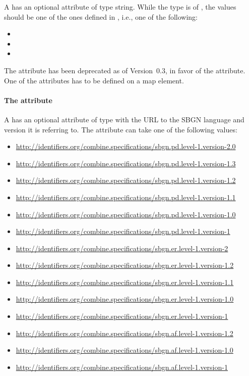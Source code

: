 A \Map has an optional attribute  of type
string. While the type is of , the values should be one of the ones defined in , i.e., one of the following:

\begin{itemize}
	\item {}
  \item {}
  \item {}
\end{itemize}

The  attribute has been deprecated as of Version~0.3, in favor of the  attribute. One of the attributes has to be defined on a map element.

\paragraph{The \fixttspace{} attribute}

A \Map has an optional attribute  of type
 with the URL to the SBGN language and version it is referring to. The attribute can take one of the following values:

\begin{itemize}
  \item \url{http://identifiers.org/combine.specifications/sbgn.pd.level-1.version-2.0}
  \item \url{http://identifiers.org/combine.specifications/sbgn.pd.level-1.version-1.3}
  \item \url{http://identifiers.org/combine.specifications/sbgn.pd.level-1.version-1.2}
  \item \url{http://identifiers.org/combine.specifications/sbgn.pd.level-1.version-1.1}
  \item \url{http://identifiers.org/combine.specifications/sbgn.pd.level-1.version-1.0}
  \item \url{http://identifiers.org/combine.specifications/sbgn.pd.level-1.version-1}
  \item \url{http://identifiers.org/combine.specifications/sbgn.er.level-1.version-2}
  \item \url{http://identifiers.org/combine.specifications/sbgn.er.level-1.version-1.2}
  \item \url{http://identifiers.org/combine.specifications/sbgn.er.level-1.version-1.1}
  \item \url{http://identifiers.org/combine.specifications/sbgn.er.level-1.version-1.0}
  \item \url{http://identifiers.org/combine.specifications/sbgn.er.level-1.version-1}
  \item \url{http://identifiers.org/combine.specifications/sbgn.af.level-1.version-1.2}
  \item \url{http://identifiers.org/combine.specifications/sbgn.af.level-1.version-1.0}
  \item \url{http://identifiers.org/combine.specifications/sbgn.af.level-1.version-1}
\end{itemize}

